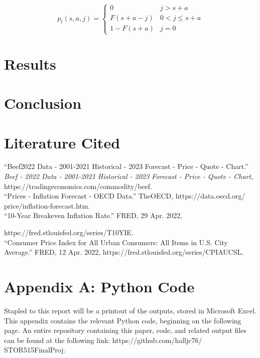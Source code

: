 \documentclass[12pt,a4paper]{article}
\begin{document}
\normalsize

\begin{equation} \label{4}
p_{t}(s,a,j) = \begin{cases} 0 & j > s + a \\ F(s + a - j) & 0 < j \leq s + a \\ 1 - F(s + a) & j = 0 \end{cases}
\end{equation}

\section{Results}

\section{Conclusion}

\newpage

\section{Literature Cited}

“Beef2022 Data - 2001-2021 Historical - 2023 Forecast - Price - Quote - Chart.” 
\textit{Beef - 2022 Data - 2001-2021 Historical - 2023 Forecast - Price - Quote - Chart}, https://tradingeconomics.com/commodity/beef. 
\\

“Prices - Inflation Forecast - OECD Data.” TheOECD,
https://data.oecd.org/
price/inflation-forecast.htm. 
\\

“10-Year Breakeven Inflation Rate.” FRED, 29 Apr. 2022, 

https://fred.stlouisfed.org/series/T10YIE. 
\\

“Consumer Price Index for All Urban Consumers: All Items in U.S. City Average.” FRED, 12 Apr. 2022, https://fred.stlouisfed.org/series/CPIAUCSL. 

\section{Appendix A: Python Code}

Stapled to this report will be a printout of the outputs, stored in Microsoft Excel. This appendix contains the relevant Python code, beginning on the following page. An entire repository containing this paper, code, and related output files can be found at the following link: 
https://github.com/halljc76/
STOR515FinalProj. 
\\
\end{document}

